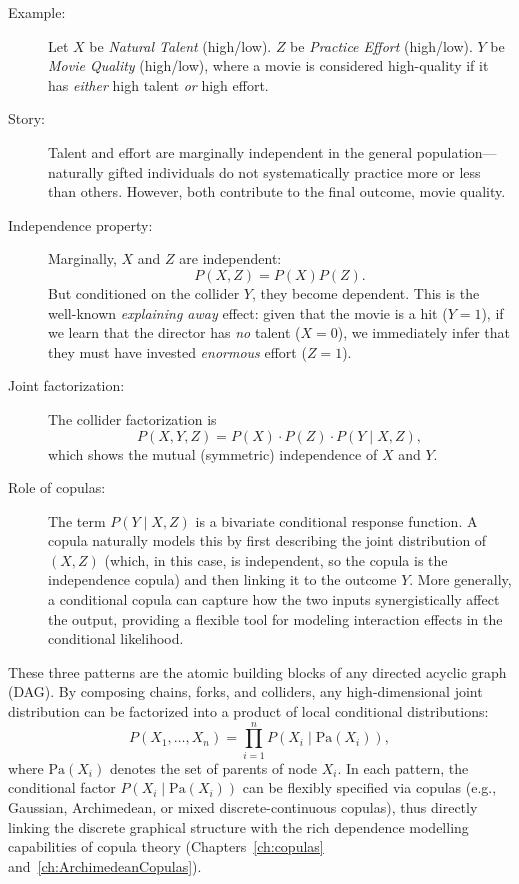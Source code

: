 \begin{itemize}
\begin{description}
\item[Example:] Let \(X\) be \emph{Natural Talent} (high/low). \(Z\) be \emph{Practice Effort} (high/low). \(Y\) be \emph{Movie Quality} (high/low), where a movie is considered high-quality if it has \emph{either} high talent \emph{or} high effort.
\item[Story:] Talent and effort are marginally independent in the general population---naturally gifted individuals do not systematically practice more or less than others. However, both contribute to the final outcome, movie quality.
\item[Independence property:] Marginally, \(X\) and \(Z\) are independent:
\[
P(X,Z) = P(X)P(Z).
\]
But conditioned on the collider \(Y\), they become dependent. This is the well-known \emph{explaining away} effect: given that the movie is a hit (\(Y=1\)), if we learn that the director has \emph{no} talent (\(X=0\)), we immediately infer that they must have invested \emph{enormous} effort (\(Z=1\)).
\item[Joint factorization:] The collider factorization is
\[
P(X,Y,Z) = P(X) \cdot P(Z) \cdot P(Y \mid X,Z),
\]
which shows the mutual (symmetric) independence of $X$ and $Y$.
\item[Role of copulas:] The term \(P(Y \mid X,Z)\) is a bivariate conditional response function. A copula naturally models this by first describing the joint distribution of \((X,Z)\) (which, in this case, is independent, so the copula is the independence copula) and then linking it to the outcome \(Y\). More generally, a conditional copula can capture how the two inputs synergistically affect the output, providing a flexible tool for modeling interaction effects in the conditional likelihood.
\end{description}
\end{itemize}

These three patterns are the atomic building blocks of any directed acyclic graph (DAG). By composing chains, forks, and colliders, any high-dimensional joint distribution can be factorized into a product of local conditional distributions:
\[
P(X_1, \dots, X_n) = \prod_{i=1}^n P(X_i \mid \text{Pa}(X_i)),
\]
where \(\text{Pa}(X_i)\) denotes the set of parents of node \(X_i\). In each pattern, the conditional factor \(P(X_i \mid \text{Pa}(X_i))\) can be flexibly specified via copulas (e.g., Gaussian, Archimedean, or mixed discrete-continuous copulas), thus directly linking the discrete graphical structure with the rich dependence modelling capabilities of copula theory (Chapters~\ref{ch:copulas} and~\ref{ch:ArchimedeanCopulas}).

